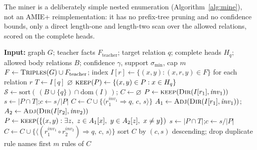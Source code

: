 \documentclass[11pt]{article}
\theoremstyle{plain}
\begin{document}
The miner is a deliberately simple nested enumeration
(Algorithm~\ref{alg:mine}), not an AMIE+ reimplementation: it has no
prefix-tree pruning and no confidence bounds, only a direct length-one and
length-two scan over the allowed relations, scored on the complete heads.

\begin{algorithm}[t]
\caption{AMIE-style rule miner (\texttt{tacet.distill.mine\_rules})}
\label{alg:mine}
\begin{algorithmic}[1]
  \State \textbf{Input:} graph $G$; teacher facts $F_{\mathrm{teacher}}$; target
  relation $q$; complete heads $H_q$; allowed body relations $B$; confidence
  $\gamma$, support $\sigma_{\mathrm{min}}$, cap $m$
  \State $F \gets \textsc{Triples}(G)\cup F_{\mathrm{teacher}}$;\quad
  index $I[r]\gets\{(x,y):(x,r,y)\in F\}$ for each relation $r$
  \State $T \gets I[q]$ 
   \Return $\varnothing$ \EndIf
  \State $\textsc{keep}(P)\gets\{(x,y)\in P : x\in H_q\}$
  \State $\mathcal{S} \gets \mathrm{sort}(\,(B\cup\{q\})\cap \mathrm{dom}(I)\,)$;\quad
  $C \gets \varnothing$
    \State $P \gets \textsc{keep}(\textsc{Dir}(I[r_1],\mathit{inv}_1))$
      \State $s\gets|P\cap T|$;\quad $c\gets s/|P|$
        $C\gets C\cup\{\langle r_1^{\mathit{inv}_1}\!\Rightarrow q,\,c,\,s\rangle\}$
      \EndIf
    \EndIf
  \EndFor
    \State $A_1\gets\textsc{Adj}(\textsc{Dir}(I[r_1],\mathit{inv}_1))$;\quad
    $A_2\gets\textsc{Adj}(\textsc{Dir}(I[r_2],\mathit{inv}_2))$
    \State $P \gets \textsc{keep}(\{(x,y): \exists z,\ z\in A_1[x],\ y\in A_2[z],\ x\neq y\})$
      \State $s\gets|P\cap T|$;\quad $c\gets s/|P|$
        $C\gets C\cup\{\langle (r_1^{\mathit{inv}_1}\!\circ r_2^{\mathit{inv}_2})\!\Rightarrow q,\,c,\,s\rangle\}$
      \EndIf
    \EndIf
  \EndFor
  \State sort $C$ by $(c,s)$ descending; drop duplicate rule names
  \State \Return first $m$ rules of $C$
\EndFunction
\end{algorithmic}
\end{algorithm}
\end{document}

